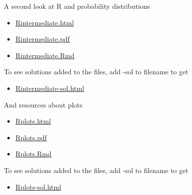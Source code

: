 \documentclass[10pt,ignorenonframetext,]{beamer}
\providecommand{\tightlist}{%
  \setlength{\itemsep}{0pt}\setlength{\parskip}{0pt}}
\begin{document}
\begin{frame}

\begin{block}{A second look at R and probability distributions}

\begin{itemize}
\tightlist
\item
  \href{https://www.math.ntnu.no/emner/TMA4268/2019v/1Intro/Rintermediate.html}{Rintermediate.html}
\item
  \href{https://www.math.ntnu.no/emner/TMA4268/2019v/1Intro/Rintermediate.pdf}{Rintermediate.pdf}
\item
  \href{https://www.math.ntnu.no/emner/TMA4268/2019v/1Intro/Rintermediate.Rmd}{Rintermediate.Rmd}
\end{itemize}

To see solutions added to the files, add -sol to filename to get

\begin{itemize}
\tightlist
\item
  \href{https://www.math.ntnu.no/emner/TMA4268/2019v/1Intro/Rintermediate-sol.html}{Rintermediate-sol.html}
\end{itemize}

\end{block}

\begin{block}{And resources about plots}

\begin{itemize}
\tightlist
\item
  \href{https://www.math.ntnu.no/emner/TMA4268/2019v/1Intro/Rplots.html}{Rplots.html}
\item
  \href{https://www.math.ntnu.no/emner/TMA4268/2019v/1Intro/Rplots.pdf}{Rplots.pdf}
\item
  \href{https://www.math.ntnu.no/emner/TMA4268/2019v/1Intro/Rplots.Rmd}{Rplots.Rmd}
\end{itemize}

To see solutions added to the files, add -sol to filename to get

\begin{itemize}
\tightlist
\item
  \href{https://www.math.ntnu.no/emner/TMA4268/2019v/1Intro/Rplots-sol.html}{Rplots-sol.html}
\end{itemize}

\end{block}

\end{frame}
\end{document}
